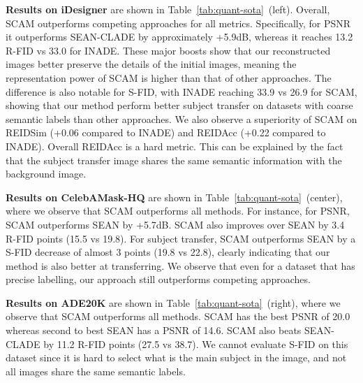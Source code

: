 \documentclass[runningheads]{llncs}
\makeatletter
\newcommand{\mname}{SCAM\@\xspace}
\makeatother
\begin{document}
\noindent \textbf{Results on iDesigner} are shown in 
Table~\ref{tab:quant-sota}~(left). 
Overall, \mname outperforms competing approaches for all metrics. 
Specifically, for PSNR it outperforms SEAN-CLADE by approximately +5.9dB, whereas it reaches 13.2 R-FID vs 33.0 for INADE.
These major boosts show that our reconstructed images  better preserve the details of the initial images, meaning the representation power of \mname is higher than that of other approaches. 
The difference is also notable for S-FID, with INADE reaching 33.9 vs 26.9 for \mname, showing that our method perform better subject transfer on datasets with coarse semantic labels than other approaches.
We also observe a superiority of SCAM on REIDSim (+0.06 compared to INADE) and REIDAcc (+0.22 compared to INADE).
Overall REIDAcc is a hard metric. This can be explained by the fact that the subject transfer image shares the same semantic information with the background image.





\noindent \textbf{Results on CelebAMask-HQ} are shown in Table~\ref{tab:quant-sota}~(center), where we observe that \mname outperforms all methods. 
For instance, for PSNR, \mname outperforms SEAN by +5.7dB. \mname also improves over SEAN by 3.4 R-FID points  (15.5 vs 19.8). 
For subject transfer, \mname outperforms SEAN by a S-FID decrease of almost 3 points (19.8 vs 22.8), clearly indicating that our method is also better at transferring. 
We observe that even for a dataset that has precise labelling, our approach still outperforms competing approaches.

\noindent \textbf{Results on ADE20K} are shown in Table~\ref{tab:quant-sota}~(right), where we observe that \mname outperforms all methods. 
\mname has the best PSNR of 20.0 whereas second to best SEAN has a PSNR of 14.6. \mname also beats SEAN-CLADE by 11.2 R-FID points  (27.5 vs 38.7). 
We cannot evaluate S-FID on this dataset since it is hard to select what is the main subject in the image, and not all images share the same semantic labels.
\end{document}
